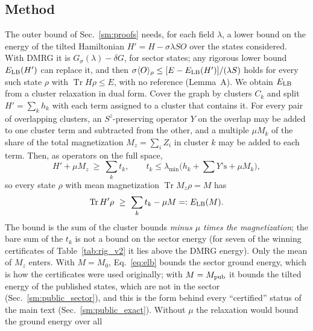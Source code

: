 \documentclass[aps,prx,onecolumn,10pt,nofootinbib,longbibliography,floatfix]{revtex4-2}
\theoremstyle{remark}
\newcommand{\Tr}{\operatorname{Tr}}
\begin{document}
\subsection{Method}
The outer bound of Sec.~\ref{sm:proofs} needs, for each field $\lambda$, a lower bound on the energy of
the tilted Hamiltonian $H'=H-\sigma\lambda SO$ over the states considered. With DMRG it is $G_\sigma(\lambda)-\delta G$, for sector states; any rigorous lower bound
$E_{\rm LB}(H')$ can replace it, and then $\sigma\langle O\rangle_\rho\le[E-E_{\rm LB}(H')]/(\lambda S)$ holds for every
such state $\rho$ with $\Tr H\rho\le E$, with no reference (Lemma~A). We obtain $E_{\rm LB}$ from a cluster relaxation in dual
form. Cover the graph by clusters $C_k$ and split $H'=\sum_kh_k$ with each term assigned to a cluster that contains
it. For every pair of overlapping clusters, an $S^z$-preserving operator $Y$ on the overlap may be added to one
cluster term and subtracted from the other, and a multiple $\mu M_k$ of the share of the total magnetization
$M_z=\sum_iZ_i$ in cluster $k$ may be added to each term. Then, as operators on the full space,
\begin{equation}
H'+\mu M_z\ \ge\ \sum_kt_k,\qquad t_k\le\lambda_{\min}\big(h_k+\textstyle\sum Y\text{'s}+\mu M_k\big), %
\label{eq:opineq}
\end{equation}
so every state $\rho$ with mean magnetization $\Tr M_z\rho=M$ has
\begin{equation}
\Tr H'\rho\ \ge\ \sum_kt_k-\mu M=:E_{\rm LB}(M). %
\label{eq:elb}
\end{equation}
The bound is the sum of the cluster bounds \emph{minus $\mu$ times the magnetization}; the bare sum of the $t_k$ is
not a bound on the sector energy (for seven of the winning certificates of Table~\ref{tab:rig_v2} it lies above the %
DMRG energy). Only the mean of $M_z$ enters. With $M=M_0$, Eq.~\eqref{eq:elb} bounds the sector ground energy, which
is how the certificates were used originally; with $M=M_{\rm pub}$ it bounds the tilted energy of the published states,
which are not in the sector (Sec.~\ref{sm:public_sector}), and this is the form behind every ``certified'' status of
the main text (Sec.~\ref{sm:public_exact}). Without $\mu$ the relaxation would bound the ground energy over all
\end{document}
